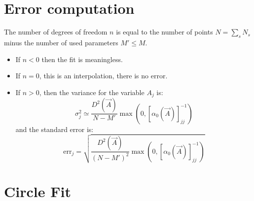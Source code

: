 \documentclass[aps,12pt]{revtex4}
\begin{document}
\section{Error computation}
The number of degrees of freedom $n$ is equal to the number of points $N=\sum_s N_s$ minus the number of used parameters $M'\leq M$.
\begin{itemize}
\item If $n<0$ then the fit is meaningless.
\item If $n=0$, this is an interpolation, there is no error.
\item If $n>0$, then the variance for the variable $A_j$ is:
\begin{equation}
	\sigma^2_j \simeq \dfrac{D^2(\vec{A})}{N-M'} \max\left(0,\left[\alpha_0(\vec{A})\right]^{-1}_{jj}\right)
\end{equation}
and the standard error is:
\begin{equation}
	\mathrm{err}_j = \sqrt{\dfrac{D^2(\vec{A})}{\left(N-M'\right)^2} \max\left(0,\left[\alpha_0(\vec{A})\right]^{-1}_{jj}\right) }
\end{equation}

\end{itemize}

\section{Circle Fit}
\end{document}
